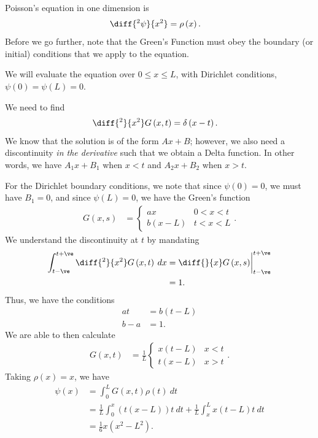 \documentclass[10pt]{mypackage}
\begin{document}
  \begin{example}
    Poisson's equation in one dimension is
    \begin{align*}
      \diff{^2\psi}{x^2} &= \rho\left( x \right).
    \end{align*}
    Before we go further, note that the Green's Function must obey the boundary (or initial) conditions that we apply to the equation.\newline

    We will evaluate the equation over $0 \leq x \leq L$, with Dirichlet conditions, $\psi(0) = \psi(L) = 0$.\newline

    We need to find
    \begin{align*}
      \diff{^2}{x^2}G\left( x,t \right) &= \delta\left( x-t \right).
    \end{align*}
    We know that the solution is of the form $Ax + B$; however, we also need a discontinuity \textit{in the derivative} such that we obtain a Delta function. In other words, we have $A_1 x + B_1$ when $x <t$ and $A_2 x + B_2$ when $x > t$.\newline

    For the Dirichlet boundary conditions, we note that since $\psi(0) = 0$, we must have $B_1 = 0$, and since $\psi(L) = 0$, we have the Green's function
    \begin{align*}
      G\left( x,s \right) &= \begin{cases}
        ax & 0 < x < t\\
        b\left( x-L \right) & t < x < L
      \end{cases}.
    \end{align*}
    We understand the discontinuity at $t$ by mandating
    \begin{align*}
      \int_{t-\ve}^{t+\ve} \diff{^2}{x^2}G\left( x,t \right)\:dx &= \diff{}{x}G\left( x,s \right)\biggr\vert_{t-\ve}^{t+\ve}\\
                                                                 &= 1.
    \end{align*}
    Thus, we have the conditions
    \begin{align*}
      at &= b\left( t-L \right)\\
      b-a &= 1.
    \end{align*}
    We are able to then calculate
    \begin{align*}
      G\left( x,t \right) &=  \frac{1}{L} \begin{cases}
        x\left( t-L \right) & x < t\\
        t\left( x-L \right) & x > t
      \end{cases}.
    \end{align*}
    Taking $\rho(x) = x$, we have
    \begin{align*}
      \psi(x) &= \int_{0}^{L} G\left( x,t \right)\rho(t)\:dt\\
              &= \frac{1}{L} \int_{0}^{x} \left( t\left( x-L \right) \right)t\:dt + \frac{1}{L} \int_{x}^{L} x\left( t-L \right)t\:dt\\
              &= \frac{1}{6}x\left( x^2 - L^2 \right).
    \end{align*}
  \end{example}
\end{document}

